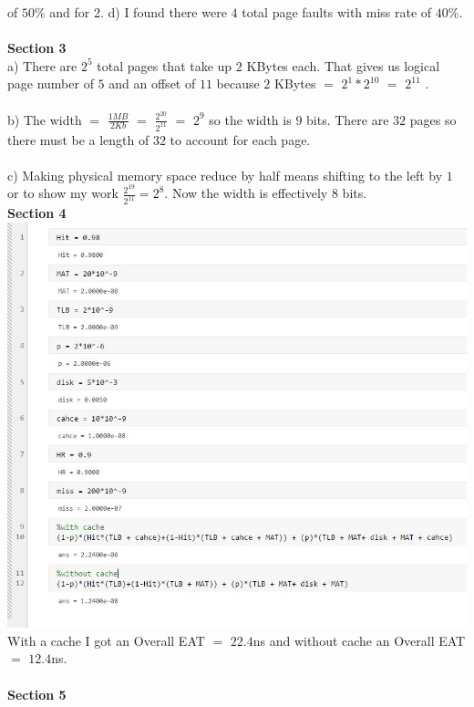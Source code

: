 \documentclass[12pt]{article}
\begin{document}
of $50\%$ and for 2. d) I found there were $4$ total page faults with miss rate 
of $40\%$. \\\\
\textbf{Section 3}\\
a) There are $2^5$ total pages that take up $2$ KBytes each. That gives us 
logical page number of $5$ and an offset of $11$ because $2$ KBytes $=$ $2^1*2^{10}$ 
$=$ $2^{11}$ .\\\\
b) The width $=$ $\frac{1MB}{2Kb}$ $=$ $\frac{2^{20}}{2^11}$ $=$ $2^9$ so the width is 
$9$ bits. There are $32$ pages so there must be a length of $32$ to account for each 
page.\\\\
c) Making physical memory space reduce by half means shifting to the left 
by $1$ or to show my work $\frac{2^19}{2^11} = 2^8$. Now the width is effectively 
$8$ bits.\\
\textbf{Section 4}\\
\includegraphics[scale = 1]{4.JPG}\\
With a cache I got an Overall EAT $=$ $22.4$ns and without cache an Overall EAT $=$ $12.4$ns.
\\\\
\textbf{Section 5}\\
\end{document}
